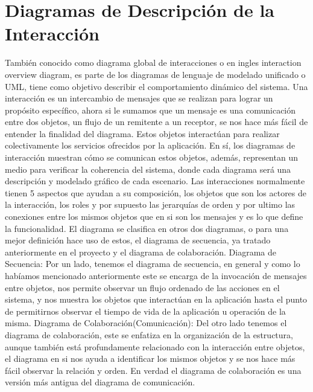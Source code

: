 \newpage

\section{Diagramas de Descripción de la Interacción}
También conocido como diagrama global de interacciones o en ingles interaction overview diagram, es parte de los diagramas de lenguaje de modelado unificado o UML, tiene como objetivo describir el comportamiento dinámico del sistema. 
\newline
Una interacción es un intercambio de mensajes que se realizan para lograr un propósito específico, ahora si le sumamos que un mensaje es una comunicación entre dos objetos, un flujo de un remitente a un receptor, se nos hace más fácil de entender la finalidad del diagrama. Estos objetos interactúan para realizar colectivamente los servicios ofrecidos por la aplicación. En sí, los diagramas de interacción muestran cómo se comunican estos objetos, además, representan un medio para verificar la coherencia del sistema, donde cada diagrama será una descripción y modelado gráfico de cada escenario.
\newline
 Las interacciones normalmente tienen 5 aspectos que ayudan a su composición, los objetos que son los actores de la interacción, los roles y por supuesto las jerarquías de orden y por ultimo las conexiones entre los mismos objetos que en si son los mensajes y es lo que define la funcionalidad.
\newline
 El diagrama se clasifica en otros dos diagramas, o para una mejor definición hace uso de estos, el diagrama de secuencia, ya tratado anteriormente en el proyecto y el diagrama de colaboración.
\newline
\newline
Diagrama de Secuencia:
\newline
Por un lado, tenemos el diagrama de secuencia, en general y como lo habíamos mencionado anteriormente este se encarga de la invocación de mensajes entre objetos, nos permite observar un flujo ordenado de las acciones en el sistema, y nos muestra los objetos que interactúan en la aplicación hasta el punto de permitirnos observar el tiempo de vida de la aplicación u operación de la misma.
\newline
\newline
Diagrama de Colaboración(Comunicación):
\newline 
Del otro lado tenemos el diagrama de colaboración, este se enfatiza en la organización de la estructura, aunque también está profundamente relacionado con la interacción entre objetos, el diagrama en si nos ayuda a identificar los mismos objetos y se nos hace más fácil observar la relación y orden. En verdad el diagrama de colaboración es una versión más antigua del diagrama de comunicación.
